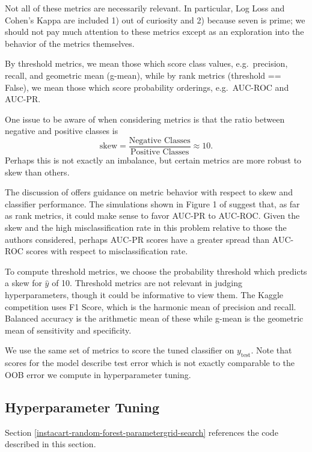 \documentclass[11pt]{article}
\theoremstyle{definition}
\numberwithin{equation}{section}
\begin{document}
Not all of these metrics are necessarily relevant. In particular, Log
Loss and Cohen's Kappa are included 1) out of curiosity and 2) because
seven is prime; we should not pay much attention to these metrics except
as an exploration into the behavior of the metrics themselves.

By threshold metrics, we mean those which score class values,
e.g.~precision, recall, and geometric mean (g-mean), while by rank
metrics (threshold == False), we mean those which score probability
orderings, e.g.~AUC-ROC and AUC-PR.

One issue to be aware of when considering metrics is that the ratio
between negative and positive classes is
\begin{equation}\label{eq:skew}
  \text{skew} = \frac{\text{Negative Classes}}{\text{Positive Classes}} \approx 10.
\end{equation} Perhaps this is not exactly an imbalance, but certain
metrics are more robust to skew than others. 


The discussion of \cite{jeniFacingImbalancedData2013} offers guidance on metric behavior
with respect to skew and classifier performance.
The simulations shown
in Figure 1 of \cite{jeniFacingImbalancedData2013} suggest that, as far
as rank metrics, it could make sense to favor AUC-PR to AUC-ROC. Given
the skew and the high misclassification rate in this problem relative to
those the authors considered, perhaps AUC-PR scores have a greater
spread than AUC-ROC scores with respect to misclassification rate.

To compute threshold metrics, we choose the probability threshold which
predicts a skew for \(\hat{y}\) of 10. Threshold metrics are not
relevant in judging hyperparameters, though it could be informative to
view them.
The Kaggle competition uses F1 Score, which is the harmonic mean of precision and recall.
Balanced accuracy is the arithmetic mean of these while g-mean is the geometric mean of 
sensitivity and specificity.

We use the same set of metrics to score the tuned classifier on
\(y_\text{test}\). Note that scores for the model describe test error
which is not exactly comparable to the OOB error we compute in
hyperparameter tuning.






\hypertarget{hyperparameter-tuning}{%
  \subsection{Hyperparameter Tuning}\label{hyperparameter-tuning}}
Section \ref{instacart-random-forest-parametergrid-search} references the code described in this section.
\end{document}
